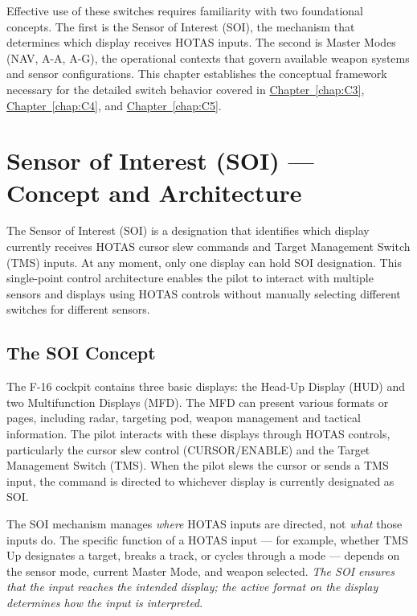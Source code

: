 \documentclass[11pt, a4paper, twoside]{report}
\newcommand{\chapref}[1]{\hyperref[#1]{Chapter~\ref*{#1}}}
\begin{document}
Effective use of these switches requires familiarity with two foundational concepts. The first is the Sensor of Interest (SOI), the mechanism that determines which display receives HOTAS inputs. The second is Master Modes (NAV, A-A, A-G), the operational contexts that govern available weapon systems and sensor configurations. This chapter establishes the conceptual framework necessary for the detailed switch 
behavior covered in \chapref{chap:C3}, \chapref{chap:C4}, and \chapref{chap:C5}.

\section{Sensor of Interest (SOI) — Concept and Architecture}
\label{sec:C2-S1}

The Sensor of Interest (SOI) is a designation that identifies which display currently receives HOTAS cursor slew commands and Target Management Switch (TMS) inputs. At any moment, only one display can hold SOI designation. This single-point control architecture enables the pilot to interact with multiple sensors and displays using HOTAS controls without manually selecting different switches for different sensors.

\subsection{The SOI Concept}
\label{sec:C2-S1-S1}

The F-16 cockpit contains three basic displays: the Head-Up Display (HUD) and two Multifunction Displays (MFD). The MFD can present various formats or pages, including radar, targeting pod, weapon management and tactical information. The pilot interacts with these displays through HOTAS controls, particularly the cursor slew control (CURSOR/ENABLE) and the Target Management Switch (TMS). When the pilot slews the cursor or sends a TMS input, the command is directed to whichever display is currently designated as SOI.

The SOI mechanism manages \textit{where} HOTAS inputs are directed, not \textit{what} those inputs do. The specific function of a HOTAS input — for example, whether TMS Up designates a target, breaks a track, or cycles through a mode — depends on the sensor mode, current Master Mode, and weapon selected. \textit{The SOI ensures that the input reaches the intended display; the active format on the display determines how the input is interpreted}.
\end{document}
